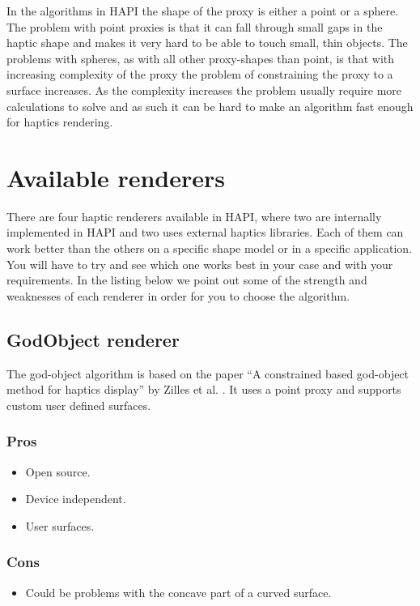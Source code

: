 In the algorithms in HAPI the shape of the proxy is either a point
or a sphere. The problem with point proxies is that it can fall
through small gaps in the haptic shape and makes it very hard to be able
to touch small, thin objects. The problems with spheres, as with
all other proxy-shapes than point, is that with
increasing complexity of the proxy the problem of constraining the
proxy to a surface increases. As the complexity increases the problem usually
require more calculations to solve and as such it can be hard to
make an algorithm fast enough for haptics rendering.

\section{Available renderers}
There are four haptic renderers available in HAPI, where two are internally
implemented in HAPI and two uses external haptics libraries. Each of them can work better than the others on a specific shape model or in a specific application. You will have to try and see which one works best in your case and with your requirements. In the listing below we point out some of the strength and weaknesses of each renderer in order for you to choose the algorithm. 

\subsection{GodObject renderer}
The god-object algorithm is based on the paper ``A constrained based god-object method for haptics display'' by Zilles et al. \cite{zilles95constraintbased}. It uses a point proxy and supports custom user defined surfaces.

\begin{minipage}[t]{3in}
\subsubsection{Pros} 
\begin{itemize} 
\item Open source. 
\item Device independent. 
\item User surfaces. 
\end{itemize} 
\end{minipage}
\begin{minipage}[t]{3in}
\subsubsection{Cons} 
\begin{itemize} 
\item Could be problems with the concave part of a curved surface.
\end{itemize}
\end{minipage}


